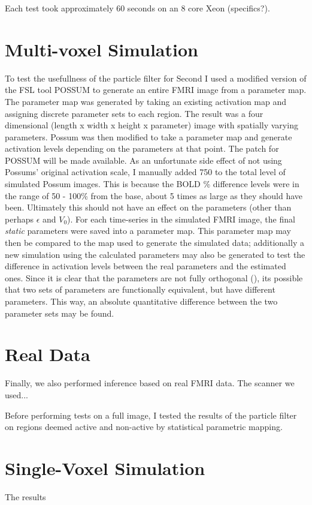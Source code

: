 Each test took approximately 60 seconds on an 8 core Xeon (specifics?).

\section{Multi-voxel Simulation}
To test the usefullness of the particle filter for Second I used a modified version of the FSL tool 
POSSUM to generate an entire FMRI image from a parameter map. The parameter map was generated
by taking an existing activation map and assigning discrete parameter sets to each region.
The result was a four dimensional (length x width
x height x parameter) image with spatially varying parameters. Possum was then modified
to take a parameter map and generate activation levels depending on the parameters at that
point. The patch for POSSUM will be made available. As an unfortunate side effect of 
not using Possums' original activation scale, I manually added 750 to the total level of
simulated Possum images. This is because the BOLD \% difference levels were in the range
of 50 - 100\% from the base, about 5 times as large as they should have been. Ultimately
this should not have an effect on the parameters (other than perhaps $\epsilon$ and $V_0$). 
For each time-series in the simulated FMRI image, the final \emph{static} parameters were saved
into a parameter map. This parameter map may then be compared to the map used to generate the 
simulated data; additionally a new simulation using the calculated parameters may also be 
generated to test the difference in activation levels between the real parameters and the
estimated ones. Since it is clear that the parameters are not fully orthogonal 
(\cite{Deneux2006}), its possible that two sets of parameters are functionally equivalent,
but have different parameters. This way, an absolute 
quantitative difference between the two parameter sets may be found.

\section{Real Data}
Finally, we also performed inference based on real FMRI data. The scanner we used...

Before performing tests on a full image, I tested the results of the particle filter
on regions deemed active and non-active by statistical parametric mapping. 
\section{Single-Voxel Simulation}
The results 

